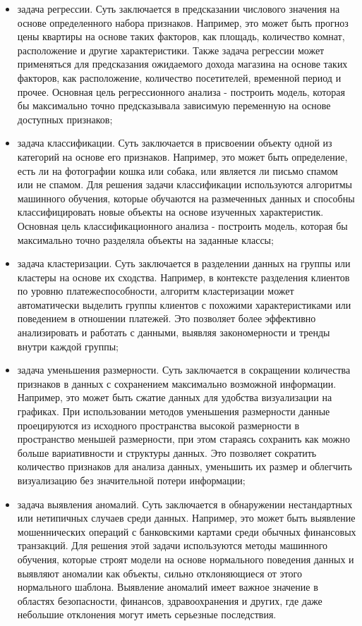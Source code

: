\begin{itemize}
	\item задача регрессии. Суть заключается в предсказании числового значения на основе определенного набора признаков. Например, это может быть прогноз цены квартиры на основе таких факторов, как площадь, количество комнат, расположение и другие характеристики. Также задача регрессии может применяться для предсказания ожидаемого дохода магазина на основе таких факторов, как расположение, количество посетителей, временной период и прочее. Основная цель регрессионного анализа - построить модель, которая бы максимально точно предсказывала зависимую переменную на основе доступных признаков;
	\item задача классификации. Суть заключается в присвоении объекту одной из категорий на основе его признаков. Например, это может быть определение, есть ли на фотографии кошка или собака, или является ли письмо спамом или не спамом. Для решения задачи классификации используются алгоритмы машинного обучения, которые обучаются на размеченных данных и способны классифицировать новые объекты на основе изученных характеристик. Основная цель классификационного анализа - построить модель, которая бы максимально точно разделяла объекты на заданные классы;
	\item задача кластеризации. Суть заключается в разделении данных на группы или кластеры на основе их сходства. Например, в контексте разделения клиентов по уровню платежеспособности, алгоритм кластеризации может автоматически выделить группы клиентов с похожими характеристиками или поведением в отношении платежей. Это позволяет более эффективно анализировать и работать с данными, выявляя закономерности и тренды внутри каждой группы;
	\item задача уменьшения размерности. Суть заключается в сокращении количества признаков в данных с сохранением максимально возможной информации. Например, это может быть сжатие данных для удобства визуализации на графиках. При использовании методов уменьшения размерности данные проецируются из исходного пространства высокой размерности в пространство меньшей размерности, при этом стараясь сохранить как можно больше вариативности и структуры данных. Это позволяет сократить количество признаков для анализа данных, уменьшить их размер и облегчить визуализацию без значительной потери информации;
	\item задача выявления аномалий. Суть заключается в обнаружении нестандартных или нетипичных случаев среди данных. Например, это может быть выявление мошеннических операций с банковскими картами среди обычных финансовых транзакций. Для решения этой задачи используются методы машинного обучения, которые строят модели на основе нормального поведения данных и выявляют аномалии как объекты, сильно отклоняющиеся от этого нормального шаблона. Выявление аномалий имеет важное значение в областях безопасности, финансов, здравоохранения и других, где даже небольшие отклонения могут иметь серьезные последствия.
\end{itemize}

